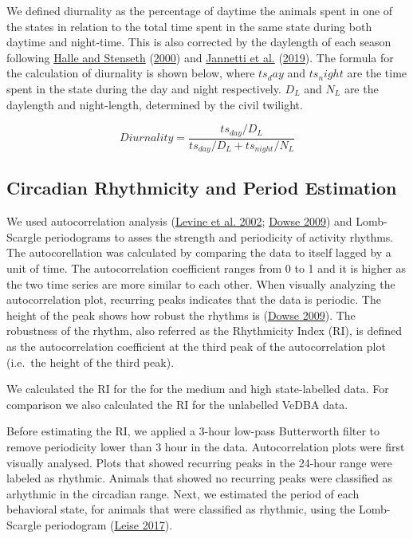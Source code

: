 \documentclass[english,msc,numbers,hidelinks]{coppe}
\begin{document}
  We defined diurnality as the percentage of daytime the animals spent in one of the states in relation to the total time spent in the same state during both daytime and night-time. This is also corrected by the daylength of each season following \protect\hyperlink{ref-activity2000}{Halle and Stenseth} (\protect\hyperlink{ref-activity2000}{2000}) and \protect\hyperlink{ref-jannetti2019}{Jannetti et al.} (\protect\hyperlink{ref-jannetti2019}{2019}). The formula for the calculation of diurnality is shown below, where \(ts_day\) and \(ts_night\) are the time spent in the state during the day and night respectively. \(D_L\) and \(N_L\) are the daylength and night-length, determined by the civil twilight.

  \[
  Diurnality = \frac{ts_{day}/D_L}{ts_{day}/D_L + ts_{night}/N_L}
  \]

  \hypertarget{circadian-rhythmicity-and-period-estimation}{%
  \subsection{Circadian Rhythmicity and Period Estimation}\label{circadian-rhythmicity-and-period-estimation}}

  We used autocorrelation analysis (\protect\hyperlink{ref-levine2002}{Levine et al. 2002}; \protect\hyperlink{ref-dowse2009}{Dowse 2009}) and Lomb-Scargle periodograms to asses the strength and periodicity of activity rhythms. The autocorellation was calculated by comparing the data to itself lagged by a unit of time. The autocorrelation coefficient ranges from 0 to 1 and it is higher as the two time series are more similar to each other. When visually analyzing the autocorrelation plot, recurring peaks indicates that the data is periodic. The height of the peak shows how robust the rhythms is (\protect\hyperlink{ref-dowse2009}{Dowse 2009}). The robustness of the rhythm, also referred as the Rhythmicity Index (RI), is defined as the autocorrelation coefficient at the third peak of the autocorrelation plot (i.e.~the height of the third peak).

  We calculated the RI for the for the medium and high state-labelled data. For comparison we also calculated the RI for the unlabelled VeDBA data.

  Before estimating the RI, we applied a 3-hour low-pass Butterworth filter to remove periodicity lower than 3 hour in the data. Autocorrelation plots were first visually analysed. Plots that showed recurring peaks in the 24-hour range were labeled as rhythmic. Animals that showed no recurring peaks were classified as arhythmic in the circadian range. Next, we estimated the period of each behavioral state, for animals that were classified as rhythmic, using the Lomb-Scargle periodogram (\protect\hyperlink{ref-leise2017}{Leise 2017}).
\end{document}
